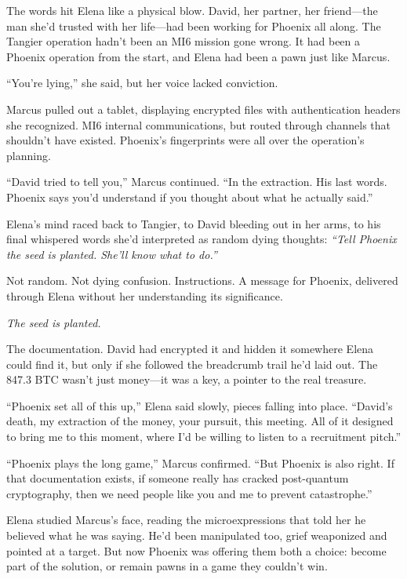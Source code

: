 The words hit Elena like a physical blow. David, her partner, her friend---the man she'd trusted with her life---had been working for Phoenix all along. The Tangier operation hadn't been an MI6 mission gone wrong. It had been a Phoenix operation from the start, and Elena had been a pawn just like Marcus.

``You're lying,'' she said, but her voice lacked conviction.

Marcus pulled out a tablet, displaying encrypted files with authentication headers she recognized. MI6 internal communications, but routed through channels that shouldn't have existed. Phoenix's fingerprints were all over the operation's planning.

``David tried to tell you,'' Marcus continued. ``In the extraction. His last words. Phoenix says you'd understand if you thought about what he actually said.''

Elena's mind raced back to Tangier, to David bleeding out in her arms, to his final whispered words she'd interpreted as random dying thoughts: \emph{``Tell Phoenix the seed is planted. She'll know what to do.''}

Not random. Not dying confusion. Instructions. A message for Phoenix, delivered through Elena without her understanding its significance.

\emph{The seed is planted.}

The documentation. David had encrypted it and hidden it somewhere Elena could find it, but only if she followed the breadcrumb trail he'd laid out. The 847.3 BTC wasn't just money---it was a key, a pointer to the real treasure.

``Phoenix set all of this up,'' Elena said slowly, pieces falling into place. ``David's death, my extraction of the money, your pursuit, this meeting. All of it designed to bring me to this moment, where I'd be willing to listen to a recruitment pitch.''

``Phoenix plays the long game,'' Marcus confirmed. ``But Phoenix is also right. If that documentation exists, if someone really has cracked post-quantum cryptography, then we need people like you and me to prevent catastrophe.''

Elena studied Marcus's face, reading the microexpressions that told her he believed what he was saying. He'd been manipulated too, grief weaponized and pointed at a target. But now Phoenix was offering them both a choice: become part of the solution, or remain pawns in a game they couldn't win.

